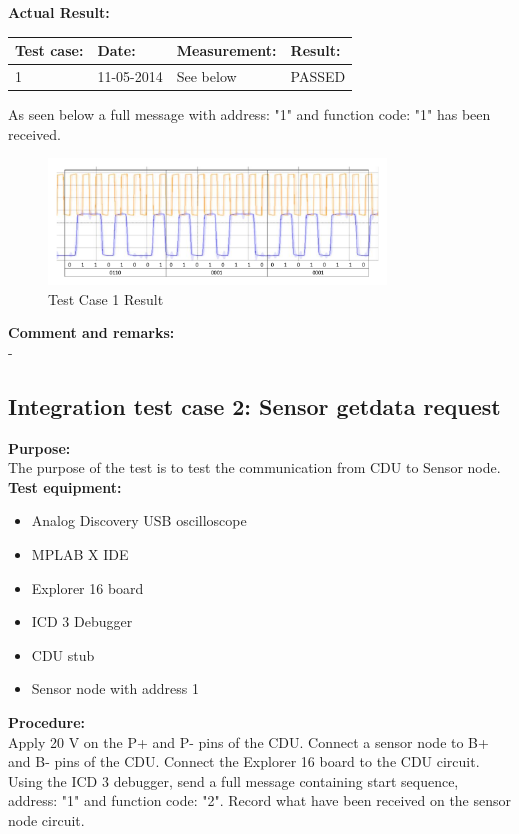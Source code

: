 \textbf{Actual Result:}\\
\begin{table}[H]
\centering
\begin{tabular}{|p{2cm}|p{2cm}|p{3cm}|p{2cm}|}\hline
\textbf{Test case:} & \textbf{Date:} & \textbf{Measurement:} & \textbf{Result:} \\ \hline
1 & 11-05-2014 & See below & PASSED \\ \hline
\end{tabular}
\end{table}
As seen below a full message with address: "1" and function code: "1" has been received.
\begin{figure}[H]
\centering
\includegraphics[width=0.8\textwidth]{billeder/CDUtestcase9}
\caption{Test Case 1 Result}
\label{fig:InteTestCase1}
\end{figure}

\textbf{Comment and remarks:}\\
-\\

\subsection{Integration test case 2: Sensor getdata request}
\textbf{Purpose:}\\
The purpose of the test is to test the communication from CDU to Sensor node.\\

\textbf{Test equipment:}
\begin{itemize}
\item Analog Discovery USB oscilloscope
\item MPLAB X IDE
\item Explorer 16 board
\item ICD 3 Debugger
\item CDU stub
\item Sensor node with address 1
\end{itemize}

\textbf{Procedure:}\\
Apply 20 V on the P+ and P- pins of the CDU. Connect a sensor node to B+ and B- pins of the CDU. Connect the Explorer 16 board to the CDU circuit. Using the ICD 3 debugger, send a full message containing start sequence, address: "1" and function code: "2". Record what have been received on the sensor node circuit.\\

